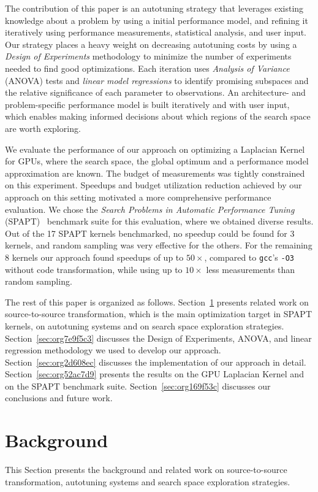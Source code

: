 \documentclass[conference]{IEEEtran}
\begin{document}
The contribution of this paper is an autotuning strategy that leverages existing
knowledge about a problem by using a initial performance model, and refining it
iteratively using performance measurements, statistical analysis, and user
input. Our strategy places a heavy weight on decreasing autotuning costs by
using a \emph{Design of Experiments} methodology to minimize the number of
experiments needed to find good optimizations. Each iteration uses \emph{Analysis of
Variance} (ANOVA) tests and \emph{linear model regressions} to identify promising
subspaces and the relative significance of each parameter to observations. An
architecture- and problem-specific performance model is built iteratively and
with user input, which enables making informed decisions about which regions of the
search space are worth exploring.

We evaluate the performance of our approach on optimizing a Laplacian Kernel for
GPUs, where the search space, the global optimum and a performance model
approximation are known. The budget of measurements was tightly constrained on
this experiment. Speedups and budget utilization reduction achieved by our
approach on this setting motivated a more comprehensive performance evaluation.
We chose the \emph{Search Problems in Automatic Performance Tuning}
(SPAPT)~\cite{balaprakash2012spapt} benchmark suite for this evaluation,
where we obtained diverse results. Out of the 17 SPAPT kernels benchmarked, no
speedup could be found for 3 kernels, and random sampling was very effective for
the others. For the remaining 8 kernels our approach found speedups of up to
\(50\times\), compared to \texttt{gcc}'s \texttt{-O3} without code transformation, while using
up to \(10\times\) less measurements than random sampling.

The rest of this paper is organized as follows. Section~\ref{sec:org78a0f49}
presents related work on source-to-source transformation, which is the main
optimization target in SPAPT kernels, on autotuning systems and on search space
exploration strategies. Section~\ref{sec:org7e9f5c3} discusses the Design
of Experiments, ANOVA, and linear regression methodology we used to develop our
approach. Section~\ref{sec:org2d608ec} discusses the
implementation of our approach in detail. Section~\ref{sec:org52ac7d9}
presents the results on the GPU Laplacian Kernel and on the SPAPT benchmark
suite. Section~\ref{sec:org169f53c} discusses our conclusions and future work.
\section{Background}
\label{sec:org78a0f49}
This Section presents the background and related work on source-to-source
transformation, autotuning systems and search space exploration strategies.
\end{document}
